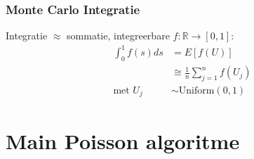 \documentclass[18pt,aspectratio=149]{beamer}
\begin{document}
\begin{frame}
    \frametitle{Monte Carlo Integratie}
    Integratie $\approx$ sommatie, integreerbare $f: \mathbb{R} \rightarrow [0,1]$:
    \begin{align}
        \int_{0}^{1} f(s) ds & = E[f(U)]                                 \\
                             & \cong \frac{1}{n} \sum_{j=1}^{n} f(U_{j}) \\
        \text{met } U_{j}    & \sim \text{Uniform}(0,1)
    \end{align}
\end{frame}

\section{Main Poisson algoritme}

\begin{frame}
    \tableofcontentscurrent
\end{frame}
\end{document}
